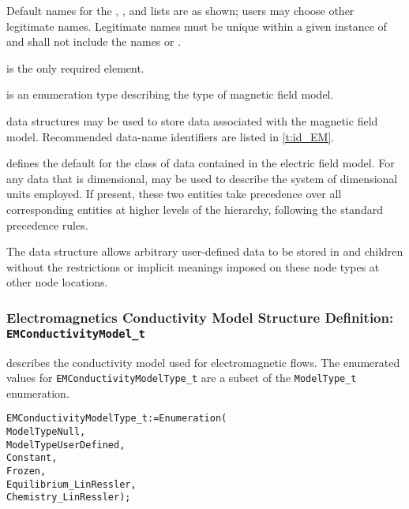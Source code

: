 \begin{notes}
\item Default names for the , , and
      lists are as shown; users may choose other legitimate names.
      Legitimate names must be unique within a given instance of
       and shall not include the names
       or .
\item {} is the only required element.
\end{notes}

 is an enumeration type describing
the type of magnetic field model.

 data structures may be used to store data associated
with the magnetic field model.
Recommended data-name identifiers are listed in \autoref{t:id_EM}.

 defines the default for the class of data contained in
the electric field model.
For any data that is dimensional,  may be used to
describe the system of dimensional units employed.
If present, these two entities take precedence over all corresponding
entities at higher levels of the hierarchy, following the standard
precedence rules.

The  data structure allows arbitrary
user-defined data to be stored in  and
 children without the restrictions or implicit
meanings imposed on these node types at other node locations.

\subsubsection{Electromagnetics Conductivity Model Structure Definition: \texttt{EMConductivityModel\_t}}

 describes the conductivity model used
for electromagnetic flows.
The enumerated values for \texttt{EMConductivityModelType\_t} are a subset of the
\texttt{ModelType\_t} enumeration.
\begin{alltt}
  EMConductivityModelType\_t := Enumeration(
    ModelTypeNull,
    ModelTypeUserDefined,
    Constant,
    Frozen,
    Equilibrium\_LinRessler,
    Chemistry\_LinRessler ) ;
\end{alltt}

